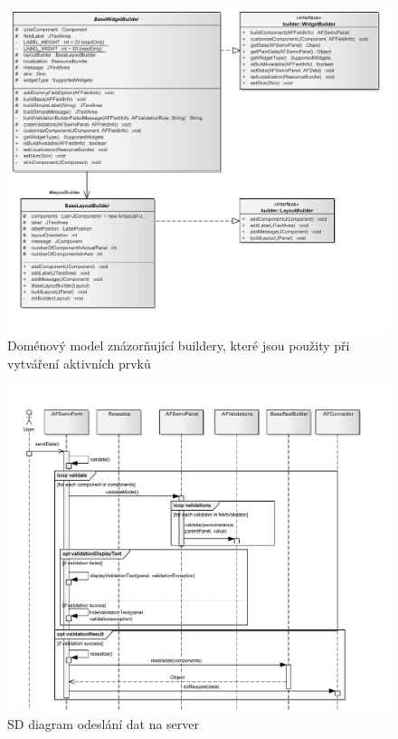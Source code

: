 \documentclass[11pt,twoside,a4paper]{book}
\begin{document}
\begin{figure}
\includegraphics[angle=270]{images/abstractBuilder}
\caption{Doménový model znázorňující buildery, které jsou použity při vytváření aktivních prvků}
\label{img:abstractBuilder}
\end{figure}	

\begin{figure}
\begin{center}
\includegraphics[angle=270]{images/sdResealization}
\caption{SD diagram odeslání dat na server}
\label{img:sdResealization}
\end{center}
\end{figure}	
\end{document}
